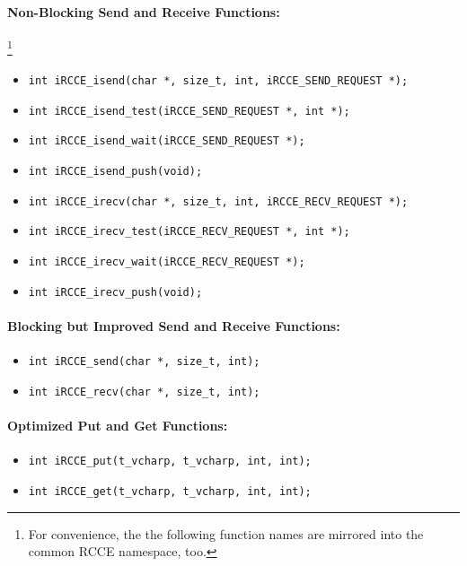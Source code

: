 \documentclass[fontsize=10pt, paper=a4, DIV12, pagesize=auto]{scrartcl}
\begin{document}
\paragraph{Non-Blocking Send and Receive Functions:}\hspace{-0.3cm}\footnote{For convenience, the the following function names are mirrored into the common RCCE namespace, too.}
\begin{itemize}
	\item \texttt{int iRCCE\_isend(char *, size\_t, int, iRCCE\_SEND\_REQUEST *);}
	\item \texttt{int iRCCE\_isend\_test(iRCCE\_SEND\_REQUEST *, int *);}
	\item \texttt{int iRCCE\_isend\_wait(iRCCE\_SEND\_REQUEST *);}
	\item \texttt{int iRCCE\_isend\_push(void);}
	\item \texttt{int iRCCE\_irecv(char *, size\_t, int, iRCCE\_RECV\_REQUEST *);}
	\item \texttt{int iRCCE\_irecv\_test(iRCCE\_RECV\_REQUEST *, int *);}
	\item \texttt{int iRCCE\_irecv\_wait(iRCCE\_RECV\_REQUEST *);}
	\item \texttt{int iRCCE\_irecv\_push(void);}
\end{itemize}
\vspace{-0.3cm}

\paragraph{Blocking but Improved Send and Receive Functions:}
\begin{itemize}
	\item \texttt{int iRCCE\_send(char *, size\_t, int);}
	\item \texttt{int iRCCE\_recv(char *, size\_t, int);}
\end{itemize}
\vspace{-0.3cm}

\paragraph{Optimized Put and Get Functions:}
\begin{itemize}
	\item \texttt{int iRCCE\_put(t\_vcharp, t\_vcharp, int, int);}
	\item \texttt{int iRCCE\_get(t\_vcharp, t\_vcharp, int, int);}
\end{itemize}
\end{document}

